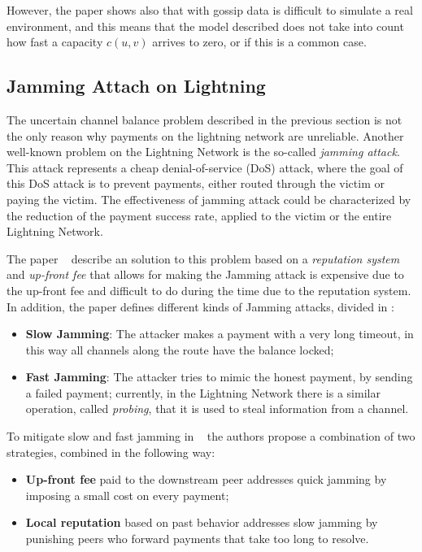 However, the paper shows also that with gossip data is difficult to simulate 
a real environment, and this means that the model described does not take into 
count  how fast a capacity $c(u, v)$ arrives to zero, or if this is a 
common case.

\subsection{Jamming Attach on Lightning}\label{sec:jamming}

The uncertain channel balance problem described in the previous section 
is not the only reason why payments on the lightning network are unreliable.
Another well-known problem on the Lightning Network is the so-called \emph{jamming attack}. This attack represents a cheap 
denial-of-service (DoS) attack, where the goal of this DoS attack 
is to prevent payments, either routed through the victim or paying the victim. 
The effectiveness of jamming attack could be characterized by the reduction of the
payment success rate, applied to the victim or the entire Lightning Network.

The paper ~\cite{cryptoeprint:2022/1454} describe an solution to this problem 
based on a \emph{reputation system} and \emph{up-front fee} that allows for making
the Jamming attack is expensive due to the up-front fee and difficult to do during the time 
due to the reputation system.
In addition, the paper defines different kinds of Jamming attacks, divided in :

\begin{itemize}
    \item {\bf Slow Jamming}: The attacker makes a payment with a very long timeout, 
        in this way all channels along the route have the balance locked;
    \item {\bf Fast Jamming}: The attacker tries to mimic the honest payment, by sending
        a failed payment; currently, in the Lightning Network there is a similar operation, called \emph{probing},
        that it is used to steal information from a channel.
\end{itemize}

To mitigate slow and fast jamming in ~\cite{cryptoeprint:2022/1454} the authors
propose a combination of two strategies, combined in the following way:

\begin{itemize}
    \item {\bf Up-front fee} paid to the downstream peer addresses quick jamming 
        by imposing a small cost on every payment;
    \item {\bf Local reputation} based on past behavior addresses slow jamming by 
        punishing peers who forward payments that take too long to resolve.
\end{itemize}

